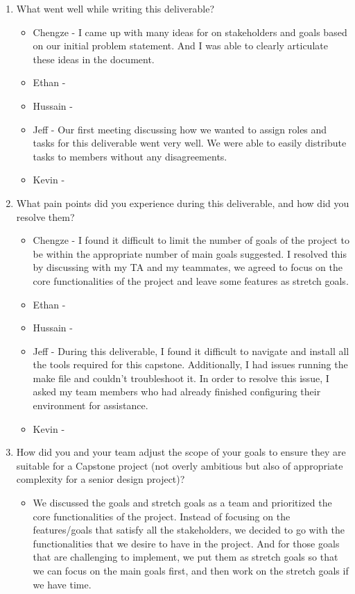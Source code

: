 \documentclass{article}
\begin{document}
\begin{enumerate}
    \item What went well while writing this deliverable? 
    \begin{itemize}
        \item Chengze - I came up with many ideas for on stakeholders 
        and goals based on our initial problem statement. And I was 
        able to clearly articulate these ideas in the document.
        \item Ethan - 
        \item Hussain -
        \item Jeff - Our first meeting discussing how we wanted to assign roles 
        and tasks for this deliverable went very well. 
        We were able to easily distribute tasks to members without any disagreements.
        \item Kevin -
    \end{itemize}

    \item What pain points did you experience during this deliverable, and how
    did you resolve them?
    \begin{itemize}
        \item Chengze - I found it difficult to limit the number 
        of goals of the project to be within the appropriate number 
        of main goals suggested. I resolved this by discussing with 
        my TA and my teammates, we agreed to focus on the core 
        functionalities of the project and leave some features as 
        stretch goals. 
        \item Ethan - 
        \item Hussain -
        \item Jeff - During this deliverable, I found it difficult to 
        navigate and install all the tools required for this capstone. 
        Additionally, I had issues running the make file and 
        couldn't troubleshoot it. In order to resolve this issue,
        I asked my team members who had already finished configuring their
        environment for assistance.
        \item Kevin -
    \end{itemize}
    
    \item How did you and your team adjust the scope of your goals to ensure
    they are suitable for a Capstone project (not overly ambitious but also of
    appropriate complexity for a senior design project)?
    \begin{itemize}
        \item We discussed the goals and stretch goals as a team
        and prioritized the core functionalities of the project.
        Instead of focusing on the features/goals that satisfy all 
        the stakeholders, we decided to go with the functionalities that
        we desire to have in the project. And for those goals that are 
        challenging to implement, we put them as stretch goals so that 
        we can focus on the main goals first, and then work on the 
        stretch goals if we have time.
    \end{itemize}
\end{enumerate}  
\end{document}
